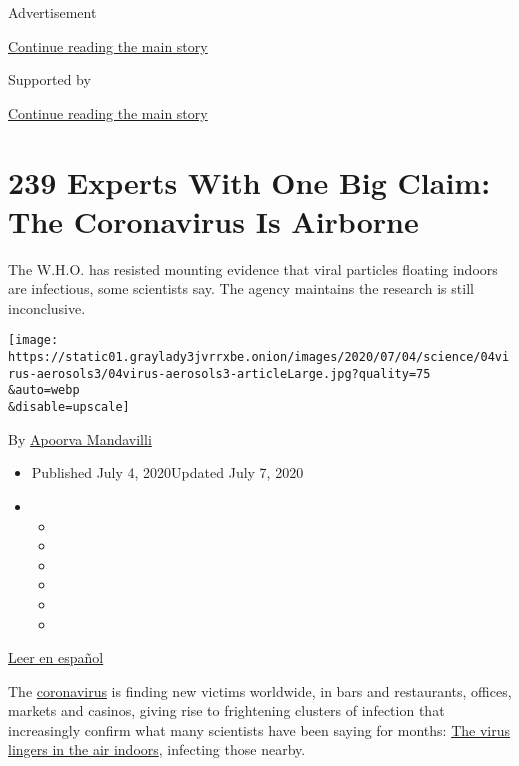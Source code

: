 Advertisement

\protect\hyperlink{after-top}{Continue reading the main story}

Supported by

\protect\hyperlink{after-sponsor}{Continue reading the main story}

\hypertarget{239-experts-with-one-big-claim-the-coronavirus-is-airborne}{%
\section{239 Experts With One Big Claim: The Coronavirus Is
Airborne}\label{239-experts-with-one-big-claim-the-coronavirus-is-airborne}}

The W.H.O. has resisted mounting evidence that viral particles floating
indoors are infectious, some scientists say. The agency maintains the
research is still inconclusive.

\texttt{[image: https://static01.graylady3jvrrxbe.onion/images/2020/07/04/science/04virus-aerosols3/04virus-aerosols3-articleLarge.jpg?quality=75\\\&auto=webp\\\&disable=upscale]}

By
\href{https://www.nytimes3xbfgragh.onion/by/apoorva-mandavilli}{Apoorva
Mandavilli}

\begin{itemize}
\item
  Published July 4, 2020Updated July 7, 2020
\item
  \begin{itemize}
  \item
  \item
  \item
  \item
  \item
  \item
  \end{itemize}
\end{itemize}

\href{https://www.nytimes3xbfgragh.onion/es/2020/07/06/espanol/ciencia-y-tecnologia/coronavirus-transmision-aire.html}{Leer
en español}

The
\href{https://www.nytimes3xbfgragh.onion/2020/07/04/health/coronavirus-neanderthals.html}{coronavirus}
is finding new victims worldwide, in bars and restaurants, offices,
markets and casinos, giving rise to frightening clusters of infection
that increasingly confirm what many scientists have been saying for
months:
\href{https://www.nytimes3xbfgragh.onion/2020/07/09/health/virus-aerosols-who.html}{The
virus lingers in the air indoors}, infecting those nearby.

